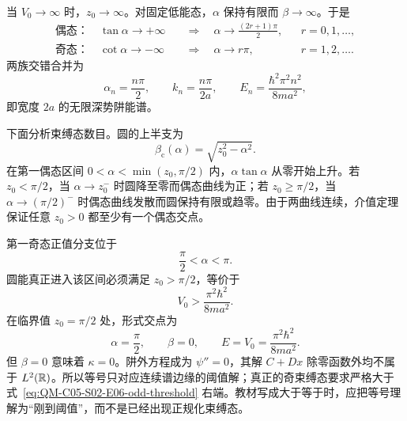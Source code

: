 \begin{checkedsolution}
当 $V_0\to\infty$ 时，$z_0\to\infty$。对固定低能态，$\alpha$ 保持有限而 $\beta\to\infty$。于是
\begin{align}
  \text{偶态：}\quad
  \tan\alpha\to+\infty
  &\quad\Longrightarrow\quad
  \alpha\to\frac{(2r+1)\pi}{2},
  &&r=0,1,\ldots,
  \label{eq:QM-C05-S02-E06-even-infinite-limit}\\
  \text{奇态：}\quad
  \cot\alpha\to-\infty
  &\quad\Longrightarrow\quad
  \alpha\to r\pi,
  &&r=1,2,\ldots.
  \label{eq:QM-C05-S02-E06-odd-infinite-limit}
\end{align}
两族交错合并为
\begin{equation}
  \alpha_n=\frac{n\pi}{2},
  \qquad
  k_n=\frac{n\pi}{2a},
  \qquad
  \boxed{E_n=\frac{\hbar^2\pi^2n^2}{8ma^2}},
  \label{eq:QM-C05-S02-E06-recovered-spectrum}
\end{equation}
即宽度 $2a$ 的无限深势阱能谱。

下面分析束缚态数目。圆的上半支为
\begin{equation}
  \beta_{\mathrm c}(\alpha)=\sqrt{z_0^2-\alpha^2}.
  \label{eq:QM-C05-S02-E06-circle-branch}
\end{equation}
在第一偶态区间 $0<\alpha<\min(z_0,\pi/2)$ 内，$\alpha\tan\alpha$ 从零开始上升。若 $z_0<\pi/2$，当 $\alpha\to z_0^-$ 时圆降至零而偶态曲线为正；若 $z_0\geq\pi/2$，当 $\alpha\to(\pi/2)^-$ 时偶态曲线发散而圆保持有限或趋零。由于两曲线连续，介值定理保证任意 $z_0>0$ 都至少有一个偶态交点。

第一奇态正值分支位于
\begin{equation}
  \frac\pi2<\alpha<\pi.
  \label{eq:QM-C05-S02-E06-first-odd-interval}
\end{equation}
圆能真正进入该区间必须满足 $z_0>\pi/2$，等价于
\begin{equation}
  \boxed{V_0>\frac{\pi^2\hbar^2}{8ma^2}}.
  \label{eq:QM-C05-S02-E06-odd-threshold}
\end{equation}
在临界值 $z_0=\pi/2$ 处，形式交点为
\begin{equation}
  \alpha=\frac\pi2,
  \qquad
  \beta=0,
  \qquad
  E=V_0=\frac{\pi^2\hbar^2}{8ma^2}.
  \label{eq:QM-C05-S02-E06-threshold-state}
\end{equation}
但 $\beta=0$ 意味着 $\kappa=0$。阱外方程成为 $\psi''=0$，其解 $C+Dx$ 除零函数外均不属于 $L^2(\mathbb{R})$。所以等号只对应连续谱边缘的阈值解；真正的奇束缚态要求严格大于式~\eqref{eq:QM-C05-S02-E06-odd-threshold} 右端。教材写成大于等于时，应把等号理解为“刚到阈值”，而不是已经出现正规化束缚态。
\end{checkedsolution}

